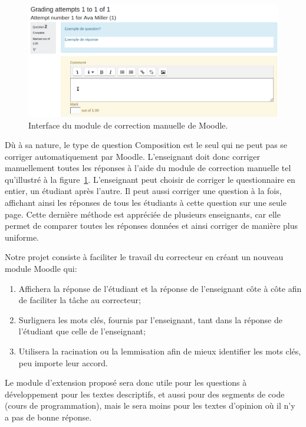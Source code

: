 \begin{figure}[htbp]
  \includegraphics[scale=0.55]{images/correction-manuelle.png}
  \caption{Interface du module de correction manuelle de Moodle.}
  \label{correction-manuelle}
\end{figure}

D\`u \`a sa nature, le type de question Composition est le seul qui ne peut pas se corriger automatiquement par Moodle.
L'enseignant doit donc corriger manuellement toutes les r\'eponses \`a l'aide du module de correction manuelle tel qu'illustr\'e \`a la figure~\ref{correction-manuelle}.
L'enseignant peut choisir de corriger le questionnaire en entier, un \'etudiant apr\`es l'autre.
Il peut aussi corriger une question \`a la fois, affichant ainsi les r\'eponses de tous les \'etudiants \`a cette question sur une seule page.
Cette derni\`ere m\'ethode est appr\'eci\'ee de plusieurs enseignants, car elle permet de comparer toutes les r\'eponses donn\'ees et ainsi corriger de mani\`ere plus uniforme.

Notre projet consiste \`a faciliter le travail du correcteur en cr\'eant un nouveau module Moodle qui:
\begin{enumerate}
  \item Affichera la r\'eponse de l'\'etudiant et la r\'eponse de l'enseignant c\^ote \`a c\^ote afin de faciliter la t\^ache au correcteur;
  \item Surlignera les mots cl\'es, fournis par l'enseignant, tant dans la r\'eponse de l'\'etudiant que celle de l'enseignant;
  \item Utilisera la racination ou la lemmisation afin de mieux identifier les mots cl\'es, peu importe leur accord.
\end{enumerate}
Le module d'extension propos\'e sera donc utile pour les questions \`a d\'eveloppement pour les textes descriptifs, et aussi pour des segments de code (cours  de programmation), mais le sera moins pour les textes d'opinion o\`u il n'y a pas de \og bonne \fg{} r\'eponse.

